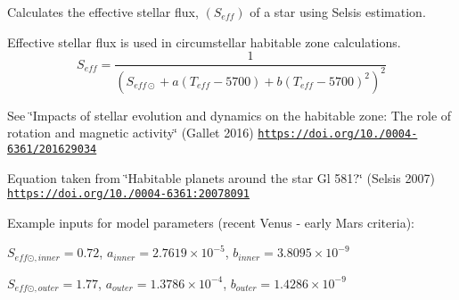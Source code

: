 Calculates the effective stellar flux, $(S_{eff})$ of a star using Selsis estimation. 

Effective stellar flux is used in circumstellar habitable zone calculations. \[S_{eff}= \frac{1}{(S_{eff\odot}+a(T_{eff}-5700)+b(T_{eff}-5700)^2)^2}\]

See \char`\"{}\+Impacts of stellar evolution and dynamics on the habitable zone\+: The role of rotation and magnetic activity\char`\"{} (Gallet 2016) \href{https://doi.org/10.1051/0004-6361/201629034}{\tt https\+://doi.\+org/10./0004-\/6361/201629034}

Equation taken from \char`\"{}\+Habitable planets around the star Gl 581?\char`\"{} (Selsis 2007) \href{https://doi.org/10.1051/0004-6361:20078091}{\tt https\+://doi.\+org/10./0004-\/6361\+:20078091}

Example inputs for model parameters (recent Venus -\/ early Mars criteria)\+:

$S_{eff\odot,inner} = 0.72$, $a_{inner} = 2.7619 \times 10^{-5}$, $b_{inner} = 3.8095 \times 10^{-9}$

$S_{eff\odot,outer} = 1.77$, $a_{outer} = 1.3786 \times 10^{-4}$, $b_{outer} = 1.4286 \times 10^{-9}$


